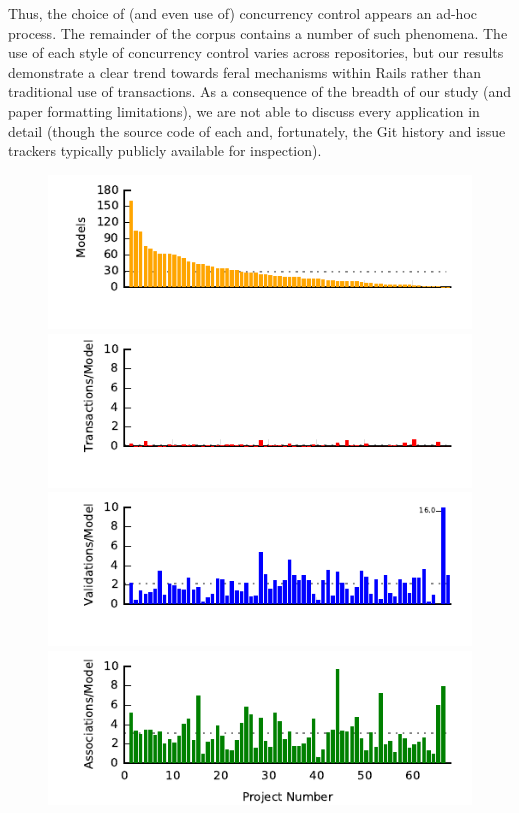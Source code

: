 Thus, the choice of (and even use of) concurrency control appears an
ad-hoc process. The remainder of the corpus contains a number of such
phenomena. The use of each style of concurrency control varies across
repositories, but our results demonstrate a clear trend towards feral
mechanisms within Rails rather than traditional use of
transactions. As a consequence of the breadth of our study (and paper
formatting limitations), we are not able to discuss every application
in detail (though the source code of each and, fortunately, the Git
history and issue trackers typically publicly available for
inspection).

\begin{figure}
  \newcommand{\skipht}{\\[-2em]}
\includegraphics[width=\columnwidth]{figs/models-single-bar.pdf}\skipht
\includegraphics[width=\columnwidth]{figs/transactions-single-bar.pdf}\skipht
\includegraphics[width=\columnwidth]{figs/validations-single-bar.pdf}\skipht
\includegraphics[width=\columnwidth]{figs/associations-single-bar.pdf}\skipht

\end{figure}
